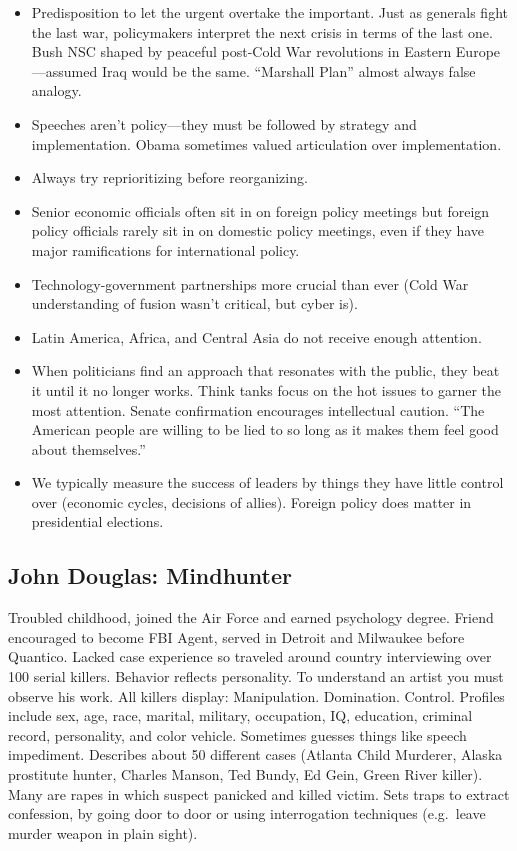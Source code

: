\documentclass[
]{article}
\begin{document}
\begin{itemize}
\item
  Predisposition to let the urgent overtake the important. Just as
  generals fight the last war, policymakers interpret the next crisis in
  terms of the last one. Bush NSC shaped by peaceful post-Cold War
  revolutions in Eastern Europe---assumed Iraq would be the same.
  ``Marshall Plan'' almost always false analogy.
\item
  Speeches aren't policy---they must be followed by strategy and
  implementation. Obama sometimes valued articulation over
  implementation.
\item
  Always try reprioritizing before reorganizing.
\item
  Senior economic officials often sit in on foreign policy meetings but
  foreign policy officials rarely sit in on domestic policy meetings,
  even if they have major ramifications for international policy.
\item
  Technology-government partnerships more crucial than ever (Cold War
  understanding of fusion wasn't critical, but cyber is).
\item
  Latin America, Africa, and Central Asia do not receive enough
  attention.
\item
  When politicians find an approach that resonates with the public, they
  beat it until it no longer works. Think tanks focus on the hot issues
  to garner the most attention. Senate confirmation encourages
  intellectual caution. ``The American people are willing to be lied to
  so long as it makes them feel good about themselves.''
\item
  We typically measure the success of leaders by things they have little
  control over (economic cycles, decisions of allies). Foreign policy
  does matter in presidential elections.
\end{itemize}

\hypertarget{john-douglas-mindhunter}{%
\subsection{John Douglas: Mindhunter}\label{john-douglas-mindhunter}}

Troubled childhood, joined the Air Force and earned psychology degree.
Friend encouraged to become FBI Agent, served in Detroit and Milwaukee
before Quantico. Lacked case experience so traveled around country
interviewing over 100 serial killers. Behavior reflects personality. To
understand an artist you must observe his work. All killers display:
Manipulation. Domination. Control. Profiles include sex, age, race,
marital, military, occupation, IQ, education, criminal record,
personality, and color vehicle. Sometimes guesses things like speech
impediment. Describes about 50 different cases (Atlanta Child Murderer,
Alaska prostitute hunter, Charles Manson, Ted Bundy, Ed Gein, Green
River killer). Many are rapes in which suspect panicked and killed
victim. Sets traps to extract confession, by going door to door or using
interrogation techniques (e.g.~leave murder weapon in plain sight).
\end{document}
